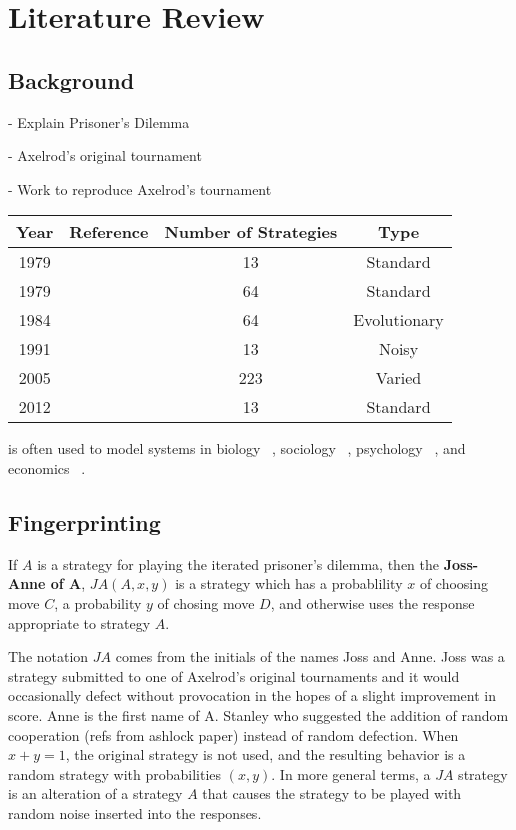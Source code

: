 
\chapter{Literature Review}\label{cha:literature_review}

\section{Background}

- Explain Prisoner's Dilemma

- Axelrod's original tournament

- Work to reproduce Axelrod's tournament ~\cite{Knight2016}

\begin{tabular}{c c c c}\label{tab:tournament_refs}
Year & Reference & Number of Strategies & Type\\
\hline
1979 & & 13 & Standard\\
1979 & & 64 & Standard\\
1984 & & 64 & Evolutionary\\
1991 & & 13 & Noisy\\
2005 & & 223 & Varied\\
2012 & & 13 & Standard\\
\hline
\end{tabular}

is often used to model systems in biology ~\cite{Sigmund1999}, sociology ~\cite{Franken2005},
psychology ~\cite{Ishibuchi2005}, and economics ~\cite{Chong2005}.


\section{Fingerprinting}\label{sec:fingerprinting}

\begin{definition}\label{def:joss-ann}
If $A$ is a strategy for playing the iterated prisoner's dilemma, then the \textbf{Joss-Anne of A}, $JA(A, x, y)$ is a strategy which has a probablility $x$ of choosing move $C$, a probability $y$ of chosing move $D$, and otherwise uses the response appropriate to strategy $A$.
\end{definition}

The notation $JA$ comes from the initials of the names Joss and Anne.
Joss was a strategy submitted to one of Axelrod’s original tournaments and it would occasionally defect without provocation in the hopes of a slight improvement in score.
Anne is the first name of A. Stanley who suggested the addition of random cooperation (refs from ashlock paper) instead of random defection.
When $x + y = 1$, the original strategy is not used, and the resulting behavior is a random strategy with probabilities $(x, y)$.
In more general terms, a $JA$ strategy is an alteration of a strategy $A$ that causes the strategy to be played with random noise inserted into the responses.

